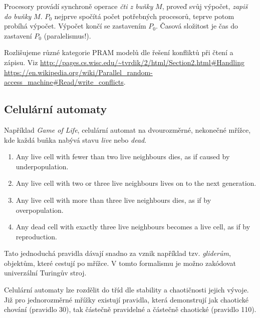 Procesory provádí synchroně operace {\em čti z buňky} $M$, proveď svůj
výpočet, {\em zapiš do buňky} $M$.
$P_0$ nejprve spočítá počet potřebných procesorů, teprve potom probíhá
výpočet. Výpočet končí se zastavením $P_0$. Časová složitost je čas
do zastavení $P_0$ (paralelismus!).

Rozlišujeme různé kategorie PRAM modelů dle řešení konfliktů při čtení a
zápisu. Viz
\href{http://pages.cs.wisc.edu/~tvrdik/2/html/Section2.html#Handling}{http://pages.cs.wisc.edu/{\textasciitilde}tvrdik/2/html/Section2.html\#Handling}\\
\href{https://en.wikipedia.org/wiki/Parallel_random-access_machine#Read/write_conflicts}{https://en.wikipedia.org/wiki/Parallel\_random-access\_machine\#Read/write\_conflicts}.

\subsection{Celulární automaty}

Například {\em Game of Life}, celulární automat na dvourozměrné, nekonečné
mřížce, kde každá buňka nabývá stavu {\em live} nebo {\em dead}.

\begin{enumerate}
    \item Any live cell with fewer than two live neighbours dies, as if caused by underpopulation.
    \item Any live cell with two or three live neighbours lives on to the next generation.
    \item Any live cell with more than three live neighbours dies, as if by overpopulation.
    \item Any dead cell with exactly three live neighbours becomes a live cell, as if by reproduction.
\end{enumerate}

Tato jednoduchá pravidla dávají snadno za vznik například tzv. {\em
gliderům}, objektům, které cestují po mřížce.
V tomto formalismu je možno zakódovat univerzální Turingův stroj.

Celulární automaty lze rozdělit do tříd dle stability a
chaotičnosti jejich vývoje. Již pro jednorozměrné
mřížky existují pravidla, která demonstrují jak chaotické chování
(pravidlo 30), tak částečně pravidelné a částečně chaotické (pravidlo
110).
